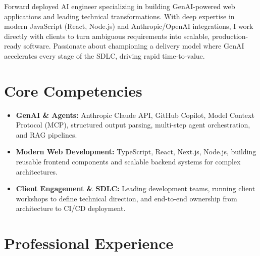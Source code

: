 \documentclass[11pt,a4paper,sans]{moderncv}
\begin{document}
\makecvtitle

Forward deployed AI engineer specializing in building GenAI-powered web applications and leading technical transformations. With deep expertise in modern JavaScript (React, Node.js) and Anthropic/OpenAI integrations, I work directly with clients to turn ambiguous requirements into scalable, production-ready software. Passionate about championing a delivery model where GenAI accelerates every stage of the SDLC, driving rapid time-to-value.

\vspace{2pt}

\section{Core Competencies}
\begin{itemize}
\item \textbf{GenAI \& Agents:} Anthropic Claude API, GitHub Copilot, Model Context Protocol (MCP), structured output parsing, multi-step agent orchestration, and RAG pipelines.
\item \textbf{Modern Web Development:} TypeScript, React, Next.js, Node.js, building reusable frontend components and scalable backend systems for complex architectures.
\item \textbf{Client Engagement \& SDLC:} Leading development teams, running client workshops to define technical direction, and end-to-end ownership from architecture to CI/CD deployment.
\end{itemize}

\section{Professional Experience}
\vspace{3pt}
\end{document}
